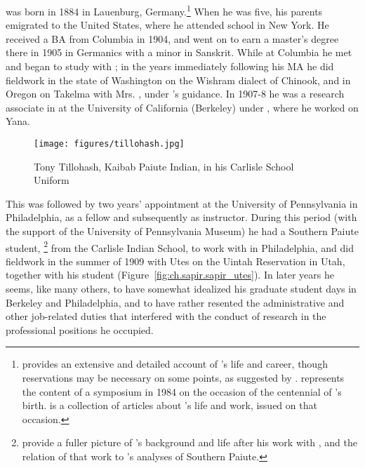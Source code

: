 was born in 1884 in Lauenburg,
Germany.\footnote{\citet{darnell90:sapir} provides an extensive and
  detailed account of {\Sapir}'s life and career, though reservations may
  be necessary on some points, as suggested by
  \citet{silverstein91:rvw.darnell}. \citealt{cowan.etal86:sapir.centennial}
  represents the content of a symposium in 1984 on the occasion of the
  centennial of {\Sapir}'s birth. \citealt{koerner84:sapir.appraisals} is
  a collection of articles about {\Sapir}'s life and work, issued on that
  occasion.} When he was five, his parents emigrated to the United
States, where he attended school in New York. He received a BA from
Columbia in 1904, and went on to earn a master's degree there in 1905
in Germanics with a minor in {Sanskrit}. While at Columbia he met and
began to study with {\Boas}; in the years immediately following his MA he
did fieldwork in the state of Washington on the Wishram dialect of
Chinook, and in Oregon on {Takelma} with Mrs. , under
{\Boas}'s guidance. In 1907-8 he was a research associate in 
at the University of California (Berkeley) under , where
he worked on Yana.

\begin{wrapfigure}{r}{.4\textwidth}
  \texttt{[image: figures/tillohash.jpg]}
  \caption{Tony Tillohash, Kaibab Paiute Indian, in his Carlisle
    School Uniform}
  \label{fig:ch.sapir.tillohash}
\end{wrapfigure}
This was followed by two years' appointment at the University of
Pennsylvania in Philadelphia, as a fellow and subsequently as
instructor. During this period (with the support of the University of
Pennsylvania Museum) he had a {Southern Paiute} student, \footnote{\citet{fowler86:tillohash} provide a fuller picture
  of 's background and life after his work with {\Sapir},
  and the relation of that work to {\Sapir}'s analyses of Southern
  Paiute.}  from the Carlisle Indian School, to work with in
Philadelphia, and did fieldwork in the summer of 1909 with Utes on the
Uintah Reservation in Utah, together with his student 
(Figure~\ref{fig:ch.sapir.sapir_utes}). In later years he seems, like
many others, to have somewhat idealized his graduate student days in
Berkeley and Philadelphia, and to have rather resented the
administrative and other job-related duties that interfered with the
conduct of research in the professional positions he occupied.


